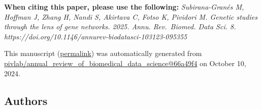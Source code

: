 { \textbf{When citing this paper, please use the following:}
\emph{Subirana-Granés M, Hoffman J, Zhang H, Nandi S, Akirtava C, Fotso K, Pividori M. Genetic studies through the lens of gene networks. 2025. Annu. Rev.~Biomed. Data Sci. 8. https://doi.org/10.1146/annurev-biodatasci-103123-095355}}

This manuscript
(\href{https://pivlab.github.io/annual_review_of_biomedical_data_science/v/66a49f4f63bfcb89ba3bd7ab5a0a44478728a6ec/}{permalink})
was automatically generated
from \href{https://github.com/pivlab/annual_review_of_biomedical_data_science/tree/66a49f4f63bfcb89ba3bd7ab5a0a44478728a6ec}{pivlab/annual\_review\_of\_biomedical\_data\_science@66a49f4}
on October 10, 2024.

\hypertarget{authors}{%
\subsection{Authors}\label{authors}}

